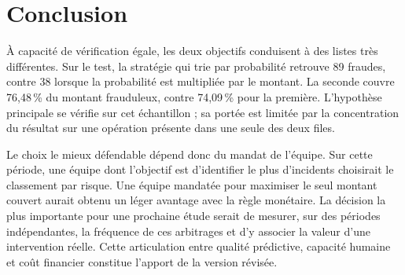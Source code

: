 \documentclass[11pt,a4paper]{article}
\begin{document}
\section{Conclusion}\label{sec:conclusion}
À capacité de vérification égale, les deux objectifs conduisent à des listes très différentes. Sur le test, la stratégie qui trie par probabilité retrouve 89 fraudes, contre 38 lorsque la probabilité est multipliée par le montant. La seconde couvre 76,48\,\% du montant frauduleux, contre 74,09\,\% pour la première. L'hypothèse principale se vérifie sur cet échantillon ; sa portée est limitée par la concentration du résultat sur une opération présente dans une seule des deux files.

Le choix le mieux défendable dépend donc du mandat de l'équipe. Sur cette période, une équipe dont l'objectif est d'identifier le plus d'incidents choisirait le classement par risque. Une équipe mandatée pour maximiser le seul montant couvert aurait obtenu un léger avantage avec la règle monétaire. La décision la plus importante pour une prochaine étude serait de mesurer, sur des périodes indépendantes, la fréquence de ces arbitrages et d'y associer la valeur d'une intervention réelle. Cette articulation entre qualité prédictive, capacité humaine et coût financier constitue l'apport de la version révisée.
\clearpage
{}
\end{document}
